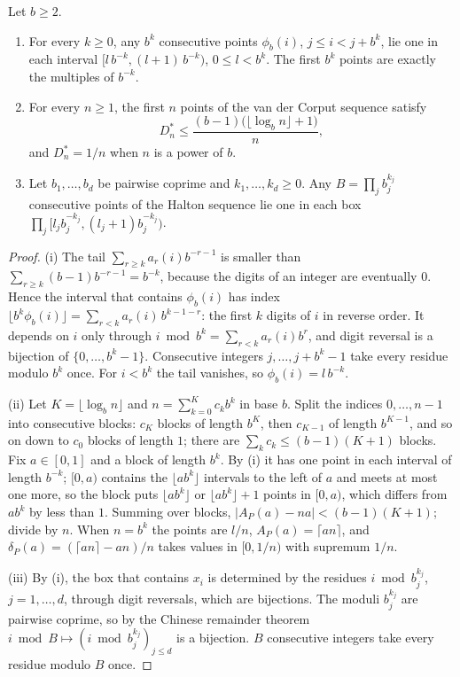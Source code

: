 \begin{proposition}\label{prop:qmc-van-der-corput}
Let $b\ge2$.
\begin{enumerate}[label=(\roman*)]
  \item For every $k\ge0$, any $b^k$ consecutive points $\phi_b(i)$, $j\le i<j+b^k$, lie one
    in each interval $[l\,b^{-k},(l+1)\,b^{-k})$, $0\le l<b^k$. The first $b^k$ points are
    exactly the multiples of $b^{-k}$.
  \item For every $n\ge1$, the first $n$ points of the van der Corput sequence satisfy
    \[
      D^*_n\le\frac{(b-1)\big(\lfloor\log_bn\rfloor+1\big)}{n},
    \]
    and $D^*_n=1/n$ when $n$ is a power of $b$.
  \item Let $b_1,\dots,b_d$ be pairwise coprime and $k_1,\dots,k_d\ge0$. Any
    $B=\prod_jb_j^{k_j}$ consecutive points of the Halton sequence lie one in each box
    $\prod_j\big[l_jb_j^{-k_j},(l_j+1)b_j^{-k_j}\big)$.
\end{enumerate}
\end{proposition}

\begin{proof}
(i) The tail $\sum_{r\ge k}a_r(i)b^{-r-1}$ is smaller than $\sum_{r\ge k}(b-1)b^{-r-1}=b^{-k}$,
because the digits of an integer are eventually $0$. Hence the interval that contains
$\phi_b(i)$ has index $\lfloor b^k\phi_b(i)\rfloor=\sum_{r<k}a_r(i)\,b^{k-1-r}$: the first $k$
digits of $i$ in reverse order. It depends on $i$ only through $i\bmod b^k=\sum_{r<k}a_r(i)b^r$,
and digit reversal is a bijection of $\{0,\dots,b^k-1\}$. Consecutive integers $j,\dots,j+b^k-1$
take every residue modulo $b^k$ once. For $i<b^k$ the tail vanishes, so $\phi_b(i)=l\,b^{-k}$.

(ii) Let $K=\lfloor\log_bn\rfloor$ and $n=\sum_{k=0}^Kc_kb^k$ in base $b$. Split the indices
$0,\dots,n-1$ into consecutive blocks: $c_K$ blocks of length $b^K$, then $c_{K-1}$ of length
$b^{K-1}$, and so on down to $c_0$ blocks of length $1$; there are
$\sum_kc_k\le(b-1)(K+1)$ blocks. Fix $a\in[0,1]$ and a block of length $b^k$. By (i) it has
one point in each interval of length $b^{-k}$; $[0,a)$ contains the
$\lfloor ab^k\rfloor$ intervals to the left of $a$ and meets at most one more, so the block puts
$\lfloor ab^k\rfloor$ or $\lfloor ab^k\rfloor+1$ points in $[0,a)$, which differs from
$ab^k$ by less than $1$. Summing over blocks, $|A_P(a)-na|<(b-1)(K+1)$; divide by $n$. When
$n=b^k$ the points are $l/n$, $A_P(a)=\lceil an\rceil$, and $\delta_P(a)=(\lceil an\rceil-an)/n$
takes values in $[0,1/n)$ with supremum $1/n$.

(iii) By (i), the box that contains $x_i$ is determined by the residues $i\bmod b_j^{k_j}$,
$j=1,\dots,d$, through digit reversals, which are bijections. The moduli $b_j^{k_j}$ are pairwise
coprime, so by the Chinese remainder theorem $i\bmod B\mapsto(i\bmod b_j^{k_j})_{j\le d}$ is a
bijection. $B$ consecutive integers take every residue modulo $B$ once.
\end{proof}

